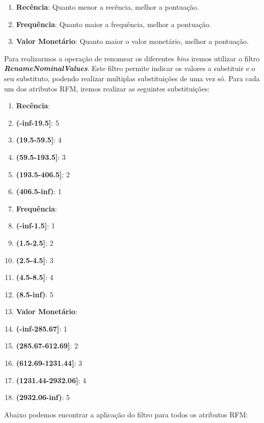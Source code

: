\documentclass{easychair}
\begin{document}
\begin{enumerate}
	\item[\textbullet] \textbf{Recência}: Quanto menor a recência, melhor a pontuação.
	\item[\textbullet] \textbf{Frequência}: Quanto maior a frequência, melhor a pontuação.
	\item[\textbullet] \textbf{Valor Monetário}: Quanto maior o valor monetário, melhor a pontuação.
\end{enumerate}

Para realizarmos a operação de renomear os diferentes \textit{bins} iremos utilizar o filtro \textit{\textbf{RenameNominalValues}}. Este filtro permite indicar os valores a substituir e o seu substituto, podendo realizar multiplas substituições de uma vez só. Para cada um dos atributos RFM, iremos realizar as seguintes substituições:

\begin{enumerate}
	\item \textbf{Recência}:
		\item[\textbullet] \textbf{(-inf-19.5]}: 5
		\item[\textbullet] \textbf{(19.5-59.5]}: 4
		\item[\textbullet] \textbf{(59.5-193.5]}: 3
		\item[\textbullet] \textbf{(193.5-406.5]}: 2
		\item[\textbullet] \textbf{(406.5-inf)}: 1
	\item \textbf{Frequência}:
		\item[\textbullet] \textbf{(-inf-1.5]}: 1
		\item[\textbullet] \textbf{(1.5-2.5]}: 2
		\item[\textbullet] \textbf{(2.5-4.5]}: 3
		\item[\textbullet] \textbf{(4.5-8.5]}: 4
		\item[\textbullet] \textbf{(8.5-inf)}: 5
	\item \textbf{Valor Monetário}:
		\item[\textbullet] \textbf{(-inf-285.67]}: 1
		\item[\textbullet] \textbf{(285.67-612.69]}: 2
		\item[\textbullet] \textbf{(612.69-1231.44]}: 3
		\item[\textbullet] \textbf{(1231.44-2932.06]}: 4
		\item[\textbullet] \textbf{(2932.06-inf)}: 5
\end{enumerate}


Abaixo podemos encontrar a aplicação do filtro para todos os atributos RFM:
\end{document}
